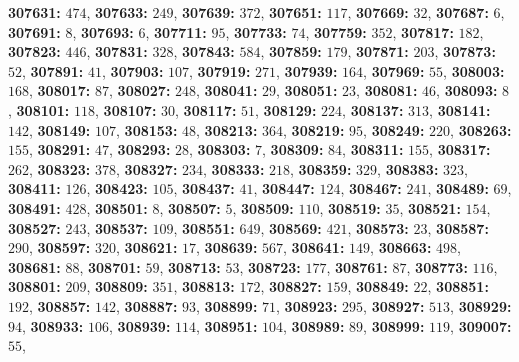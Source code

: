 \textsf{\bfseries 307631:} $474$, \textsf{\bfseries 307633:} $249$, \textsf{\bfseries 307639:} $372$, \textsf{\bfseries 307651:} $117$, \textsf{\bfseries 307669:} $32$, \textsf{\bfseries 307687:} $6$, \textsf{\bfseries 307691:} $8$, \textsf{\bfseries 307693:} $6$, \textsf{\bfseries 307711:} $95$, \textsf{\bfseries 307733:} $74$, \textsf{\bfseries 307759:} $352$, \textsf{\bfseries 307817:} $182$, \textsf{\bfseries 307823:} $446$, \textsf{\bfseries 307831:} $328$, \textsf{\bfseries 307843:} $584$, \textsf{\bfseries 307859:} $179$, \textsf{\bfseries 307871:} $203$, \textsf{\bfseries 307873:} $52$, \textsf{\bfseries 307891:} $41$, \textsf{\bfseries 307903:} $107$, \textsf{\bfseries 307919:} $271$, \textsf{\bfseries 307939:} $164$, \textsf{\bfseries 307969:} $55$, \textsf{\bfseries 308003:} $168$, \textsf{\bfseries 308017:} $87$, \textsf{\bfseries 308027:} $248$, \textsf{\bfseries 308041:} $29$, \textsf{\bfseries 308051:} $23$, \textsf{\bfseries 308081:} $46$, \textsf{\bfseries 308093:} $8$, \textsf{\bfseries 308101:} $118$, \textsf{\bfseries 308107:} $30$, \textsf{\bfseries 308117:} $51$, \textsf{\bfseries 308129:} $224$, \textsf{\bfseries 308137:} $313$, \textsf{\bfseries 308141:} $142$, \textsf{\bfseries 308149:} $107$, \textsf{\bfseries 308153:} $48$, \textsf{\bfseries 308213:} $364$, \textsf{\bfseries 308219:} $95$, \textsf{\bfseries 308249:} $220$, \textsf{\bfseries 308263:} $155$, \textsf{\bfseries 308291:} $47$, \textsf{\bfseries 308293:} $28$, \textsf{\bfseries 308303:} $7$, \textsf{\bfseries 308309:} $84$, \textsf{\bfseries 308311:} $155$, \textsf{\bfseries 308317:} $262$, \textsf{\bfseries 308323:} $378$, \textsf{\bfseries 308327:} $234$, \textsf{\bfseries 308333:} $218$, \textsf{\bfseries 308359:} $329$, \textsf{\bfseries 308383:} $323$, \textsf{\bfseries 308411:} $126$, \textsf{\bfseries 308423:} $105$, \textsf{\bfseries 308437:} $41$, \textsf{\bfseries 308447:} $124$, \textsf{\bfseries 308467:} $241$, \textsf{\bfseries 308489:} $69$, \textsf{\bfseries 308491:} $428$, \textsf{\bfseries 308501:} $8$, \textsf{\bfseries 308507:} $5$, \textsf{\bfseries 308509:} $110$, \textsf{\bfseries 308519:} $35$, \textsf{\bfseries 308521:} $154$, \textsf{\bfseries 308527:} $243$, \textsf{\bfseries 308537:} $109$, \textsf{\bfseries 308551:} $649$, \textsf{\bfseries 308569:} $421$, \textsf{\bfseries 308573:} $23$, \textsf{\bfseries 308587:} $290$, \textsf{\bfseries 308597:} $320$, \textsf{\bfseries 308621:} $17$, \textsf{\bfseries 308639:} $567$, \textsf{\bfseries 308641:} $149$, \textsf{\bfseries 308663:} $498$, \textsf{\bfseries 308681:} $88$, \textsf{\bfseries 308701:} $59$, \textsf{\bfseries 308713:} $53$, \textsf{\bfseries 308723:} $177$, \textsf{\bfseries 308761:} $87$, \textsf{\bfseries 308773:} $116$, \textsf{\bfseries 308801:} $209$, \textsf{\bfseries 308809:} $351$, \textsf{\bfseries 308813:} $172$, \textsf{\bfseries 308827:} $159$, \textsf{\bfseries 308849:} $22$, \textsf{\bfseries 308851:} $192$, \textsf{\bfseries 308857:} $142$, \textsf{\bfseries 308887:} $93$, \textsf{\bfseries 308899:} $71$, \textsf{\bfseries 308923:} $295$, \textsf{\bfseries 308927:} $513$, \textsf{\bfseries 308929:} $94$, \textsf{\bfseries 308933:} $106$, \textsf{\bfseries 308939:} $114$, \textsf{\bfseries 308951:} $104$, \textsf{\bfseries 308989:} $89$, \textsf{\bfseries 308999:} $119$, \textsf{\bfseries 309007:} $55$, 

